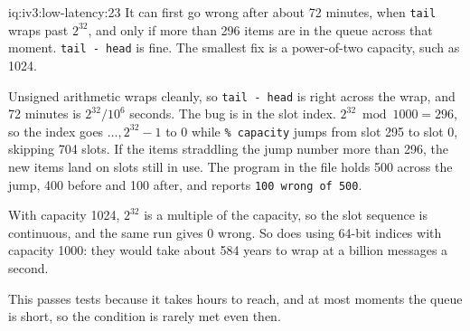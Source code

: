 \begin{solution}{iq:iv3:low-latency:23}
It can first go wrong after about 72 minutes, when \texttt{tail} wraps past $2^{32}$, and only if more than 296 items are in the queue across that moment. \texttt{tail - head} is fine. The smallest fix is a power-of-two capacity, such as 1024.

Unsigned arithmetic wraps cleanly, so \texttt{tail - head} is right across the wrap, and 72 minutes is $2^{32} / 10^6$ seconds. The bug is in the slot index. $2^{32} \bmod 1000 = 296$, so the index goes $\dots, 2^{32} - 1$ to 0 while \texttt{\% capacity} jumps from slot 295 to slot 0, skipping 704 slots. If the items straddling the jump number more than 296, the new items land on slots still in use. The program in the file holds 500 across the jump, 400 before and 100 after, and reports \texttt{100 wrong of 500}.

With capacity 1024, $2^{32}$ is a multiple of the capacity, so the slot sequence is continuous, and the same run gives 0 wrong. So does using 64-bit indices with capacity 1000: they would take about 584 years to wrap at a billion messages a second.

This passes tests because it takes hours to reach, and at most moments the queue is short, so the condition is rarely met even then.

\end{solution}

